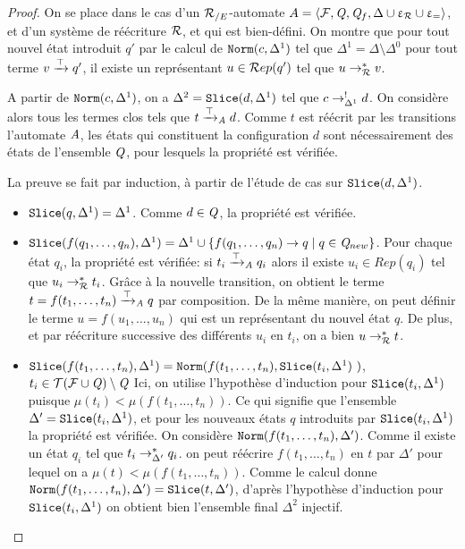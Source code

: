 \begin{proof}
  On se place dans le cas d'un ${\mathcal R_{/E}}$-automate $A = \langle \mathcal{F}, \mathit Q, \mathit Q_f, \Delta \cup \upvarepsilon_{\mathcal R} \cup \upvarepsilon_{=}\rangle$, et d'un système de réécriture $\mathcal R$,
  et qui est bien-défini.
  On montre que pour tout nouvel état introduit $q'$  par le calcul de $\mathtt{Norm}(c, \Delta^1)$ tel que $\Delta^1 = \Delta \setminus \Delta^0$
  pour tout terme $v \xrightarrow{\top} q'$, il existe un représentant $u \in \mathcal R ep(q')$ tel que $u \rightarrow^*_\mathcal R v$.

  A partir de $\mathtt{Norm}(c, \Delta^1)$, on a $\Delta^2 = \mathtt{Slice}(d, \Delta^1)$ tel que $c \rightarrow^!_{\Delta^1} d$.
  On considère alors tous les termes clos tels que $t \xrightarrow{\top}_\mathit A d$. Comme $t$ est réécrit par les transitions 
  l'automate $\mathit A$, les états qui constituent la configuration $d$ sont nécessairement des états de l'ensemble $\mathit Q$,
  pour lesquels la propriété est vérifiée.
  
  La preuve se fait par induction, à partir de l'étude de cas sur $\mathtt{Slice}(d, \Delta^1)$. 
  \begin{itemize}
  \item $\mathtt{Slice}(q, \Delta^1) = \Delta^1$. Comme $d \in \mathit Q$, la propriété est vérifiée.

  \item $\mathtt{Slice}(f(q_1, \dots, q_n), \Delta^1) = \Delta^1 \cup \{ f(q_1, \dots, q_n) \rightarrow q \; | \; q \in \mathit Q_{new}\}$. 
    Pour chaque état $q_i$, la propriété est vérifiée: si $t_i \xrightarrow{\top}_\mathit A q_i$ alors il existe $u_i \in Rep(q_i)$
    tel que $u_i \rightarrow_\mathcal R^* t_i$. Grâce à la nouvelle transition, on obtient le terme $t = f(t_1, \dots, t_n) \xrightarrow{\top}_\mathit A q$ par composition.
    De la même manière, on peut définir le terme $u = f(u_1, \dots, u_n)$ qui est un représentant du nouvel état $q$.
    De plus, et par réécriture successive des différents $u_i$ en $t_i$, on a bien $u \rightarrow^*_\mathcal R t$.

  \item $\mathtt{Slice}(f(t_1, \dots, t_n), \Delta^1) = \mathtt{Norm}(f(t_1,\dots, t_n), \mathtt{Slice}(t_i, \Delta^1)\ )$, $t_i \in \mathcal{ T(F \cup \mathit Q)} \setminus \mathit Q$
    Ici, on utilise l'hypothèse d'induction pour $\mathtt{Slice}(t_i, \Delta^1)$ puisque $\mu (t_i) < \mu(f(t_1, \dots, t_n))$.
    Ce qui signifie que l'ensemble $\Delta' = \mathtt{Slice}(t_i, \Delta^1)$, et pour les nouveaux états $q$ introduits par $\mathtt{Slice}(t_i, \Delta^1)$
    la propriété est vérifiée.
    On considère $\mathtt{Norm}(f(t_1,\dots, t_n), \Delta')$. Comme il existe un état $q_i$ tel que $t_i \rightarrow^*_{\Delta'} q_i$. on peut 
    réécrire $f(t_1,\dots, t_n)$ en $t$ par $\Delta'$ pour lequel on a $\mu (t) < \mu(f(t_1, \dots, t_n))$. Comme 
    le calcul donne $\mathtt{Norm}(f(t_1,\dots, t_n), \Delta') = \mathtt{Slice}(t, \Delta')$, d'après l'hypothèse d'induction 
    pour $\mathtt{Slice}(t_i, \Delta^1)$ on obtient bien l'ensemble final $\Delta^2$ injectif.
  \end{itemize}
\end{proof}



